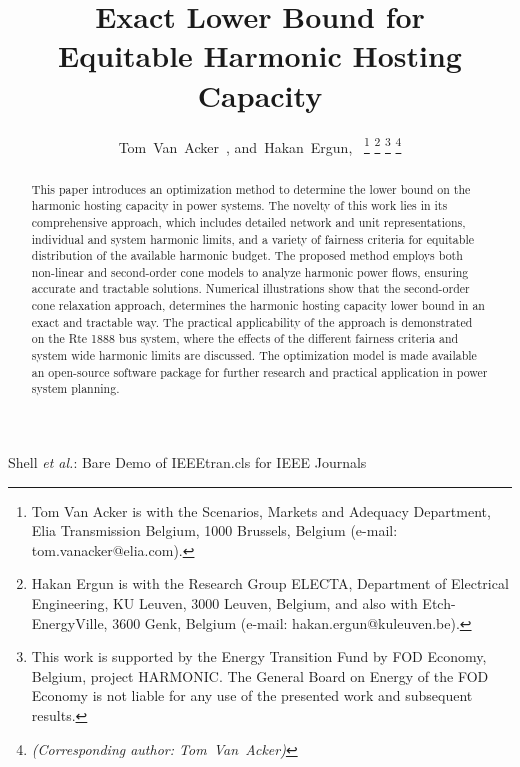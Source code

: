 \documentclass[journal]{IEEEtran}
\begin{document}
\title{Exact Lower Bound for \\ Equitable Harmonic Hosting Capacity}
\author{Tom~Van~Acker~,%
        and~Hakan~Ergun,~%
\thanks{Tom Van Acker is with the Scenarios, Markets and Adequacy Department, Elia Transmission Belgium, 1000 Brussels, Belgium (e-mail: tom.vanacker@elia.com).}%
\thanks{Hakan Ergun is with the Research Group ELECTA, Department of Electrical Engineering, KU Leuven, 3000 Leuven, Belgium, and also with Etch-EnergyVille, 3600 Genk, Belgium (e-mail: hakan.ergun@kuleuven.be).}
\thanks{This work is supported by the Energy Transition Fund by FOD Economy, Belgium, project HARMONIC. The General Board on Energy of the FOD Economy is not liable for any use of the presented work and subsequent results.}
\thanks{\textit{(Corresponding author: Tom~Van~Acker)}}}

%
{Shell \MakeLowercase{\textit{et al.}}: Bare Demo of IEEEtran.cls for IEEE Journals}

\maketitle

\begin{abstract}
This paper introduces an optimization method to determine the lower bound on the harmonic hosting capacity in power systems. The novelty of this work lies in its comprehensive approach, which includes detailed network and unit representations, individual and system harmonic limits, and a variety of fairness criteria for equitable distribution of the available harmonic budget. The proposed method employs both non-linear and second-order cone models to analyze harmonic power flows, ensuring accurate and tractable solutions. Numerical illustrations show that the second-order cone relaxation approach, determines the harmonic hosting capacity lower bound in an exact and tractable way. The practical applicability of the approach is demonstrated on the Rte 1888 bus system, where the effects of the different fairness criteria and system wide harmonic limits are discussed. The optimization model is made available an open-source software package for further research and practical application in power system planning.
\end{abstract}
\end{document}
